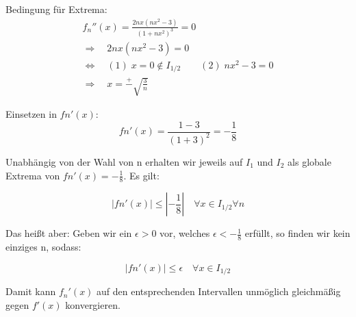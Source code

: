 \documentclass[a4paper,german,12pt,smallheadings]{scrartcl}
\begin{document}
Bedingung für Extrema:
\begin{align*}
f_n''(x)=\frac{2nx\left(nx^2-3\right)}{\left(1+nx^2\right)^3}=0\\
\Rightarrow \quad 2nx\left(nx^2-3\right)=0\\
\Leftrightarrow \quad (1)\;x=0\notin I_{1/2} \quad \quad (2)\;nx^2-3=0\\
\Rightarrow \quad x=\overset{+}{-}\sqrt{\frac{3}{n}} 
\end{align*}

Einsetzen in $fn'(x)$:
\begin{equation*}
fn'(x)=\frac{1-3}{\left(1+3\right)^2}=-\frac{1}{8}
\end{equation*}

Unabhängig von der Wahl von n erhalten wir jeweils auf $I_1$ und $I_2$ als globale Extrema von $fn'(x)=-\frac{1}{8}$. Es gilt:

\begin{equation*}
|fn'(x)|\leq\left|-\frac{1}{8}\right| \quad \forall x\in I_{1/2} \forall n
\end{equation*}

Das heißt aber: Geben wir ein $\epsilon>0$ vor, welches $\epsilon<-\frac{1}{8}$ erfüllt, so finden wir kein einziges n, sodass:

\begin{equation*}
|fn'(x)|\le\epsilon \quad \forall x \in I_{1/2}
\end{equation*}

Damit kann $f_n'(x)$ auf den entsprechenden Intervallen unmöglich gleichmäßig gegen $f'(x)$ konvergieren.
\end{document}
